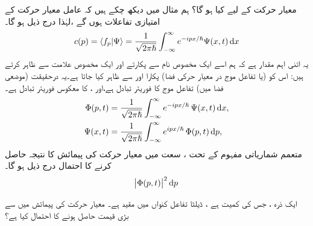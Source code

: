معیار حرکت کے لیے کیا ہو گا؟ ہم مثال  میں دیکھ چکے ہیں کہ عامل معیار حرکت کے امتیازی تفاعلات  ہوں گے ،لہٰذا درج ذیل ہو گا۔
\begin{align}
c(p) = \langle f_{p} | \Psi \rangle = \frac{1}{\sqrt{2\pi\hslash}} \int_{-\infty}^{\infty} e^{-ipx/\hslash} \Psi (x,t)\dif x
\end{align}
یہ اتنی اہم مقدار ہے کہ ہم اسے ایک مخصوص نام سے پکارتے اور ایک مخصوص علامت سے ظاہر کرتے ہیں: اس کو (یا تفاعل موج در معیار حرکی فضا)  پکارا اور  سے ظاہر کیا جاتا ہے۔یہ درحقیقت (موضعی فضا میں) تفاعل موج  کا فوریئر تبادل ہے،اور ،  کا معکوس فوریئر تبادل ہے۔
\begin{align}\label{مساوات_قواعد_معیار_حرکت_فضا_تفاعل_موج}
\Phi(p,t) &= \frac{1}{\sqrt{2\pi\hslash}} \int_{-\infty}^{\infty} e^{-ipx/\hslash}\, \Psi (x,t) \dif x, \\ 
\Psi(x,t) &= \frac{1}{\sqrt{2\pi\hslash}} \int_{-\infty}^{\infty} e^{ipx/\hslash}\, \Phi (p,t) \dif p,
\end{align}
متعمم شماریاتی مفہوم کے تحت ، سعت  میں معیار حرکت کی پیمائش   کا نتیجہ حاصل کرنے  کا احتمال درج ذیل ہو گا۔ 
\begin{align}
\abs{ \Phi(p,t)}^{2}\dif p
\end{align}

 ایک ذرہ ، جس کی کمیت  ہے ، ڈیلٹا تفاعل کنواں  میں مقید ہے۔ معیار حرکت کی پیمائش میں    سے بڑی قیمت حاصل ہونے  کا احتمال کیا ہے؟ 
 
